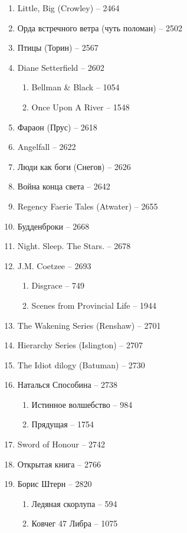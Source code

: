 \documentclass[a4paper, 11pt]{proc} %
\begin{document}
\begin{enumerate}
    \item Little, Big (Crowley) -- 2464
    \item Орда встречного ветра (чуть поломан) -- 2502
    \item Птицы (Торин) -- 2567
    \item Diane Setterfield -- 2602
        \begin{enumerate}
            \item Bellman \& Black -- 1054
            \item Once Upon A River -- 1548
        \end{enumerate}
    \item Фараон (Прус) -- 2618
    \item Angelfall -- 2622
    \item Люди как боги (Снегов) -- 2626
    \item Война конца света -- 2642
    \item Regency Faerie Tales (Atwater) -- 2655
    \item Будденброки -- 2668
    \item Night. Sleep. The Stars. -- 2678
    \item J.M. Coetzee -- 2693
        \begin{enumerate}
            \item Disgrace -- 749
            \item Scenes from Provincial Life -- 1944
        \end{enumerate}
    \item The Wakening Series (Renshaw) -- 2701
    \item Hierarchy Series (Islington) -- 2707
    \item The Idiot dilogy (Batuman) -- 2730
    \item Наталься Способина -- 2738
        \begin{enumerate}
            \item Истинное волшебство -- 984
            \item Прядущая -- 1754
        \end{enumerate}
    \item Sword of Honour -- 2742
    \item Открытая книга -- 2766
    \item Борис Штерн -- 2820
        \begin{enumerate}
            \item Ледяная скорлупа -- 594
            \item Ковчег 47 Либра -- 1075

\end{enumerate}
\end{enumerate}
\end{document}
